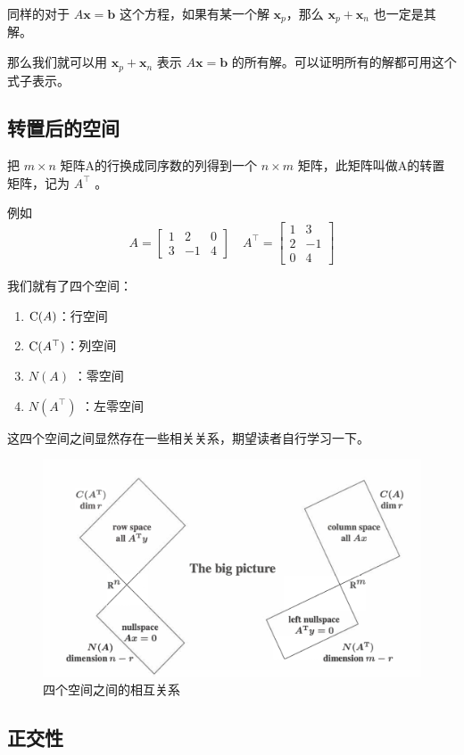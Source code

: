 同样的对于 $A\mathbf x=\mathbf b$ 这个方程，如果有某一个解 $\mathbf x_p$，那么 $\mathbf x_p+\mathbf x_n$ 也一定是其解。

那么我们就可以用 $\mathbf x_p+\mathbf x_n$ 表示 $A\mathbf x=\mathbf b$ 的所有解。可以证明所有的解都可用这个式子表示。

\subsection{转置后的空间}
把 $m\times n$ 矩阵A的行换成同序数的列得到一个 $n\times m$ 矩阵，此矩阵叫做A的转置矩阵，记为 $A^\top$ 。

例如
$$
A=\begin{bmatrix}1 & 2 & 0\\3 & -1 & 4\end{bmatrix}\quad
A^\top=\begin{bmatrix}1 & 3 \\ 2 & -1 \\ 0 & 4\end{bmatrix}
$$

我们就有了四个空间：

\begin{enumerate}
	\item $\text C(A)$：行空间
	\item $\text C(A^\top)$：列空间
	\item $N(A)$ ：零空间
	\item $N(A^\top)$ ：左零空间 
\end{enumerate}

这四个空间之间显然存在一些相关关系，期望读者自行学习一下。

\begin{figure}
	\centering
	\includegraphics[width=0.7\linewidth]{../img/screenshot001}
	\caption{四个空间之间的相互关系}
	\label{image_big_picture}
\end{figure}


\subsection{正交性}

